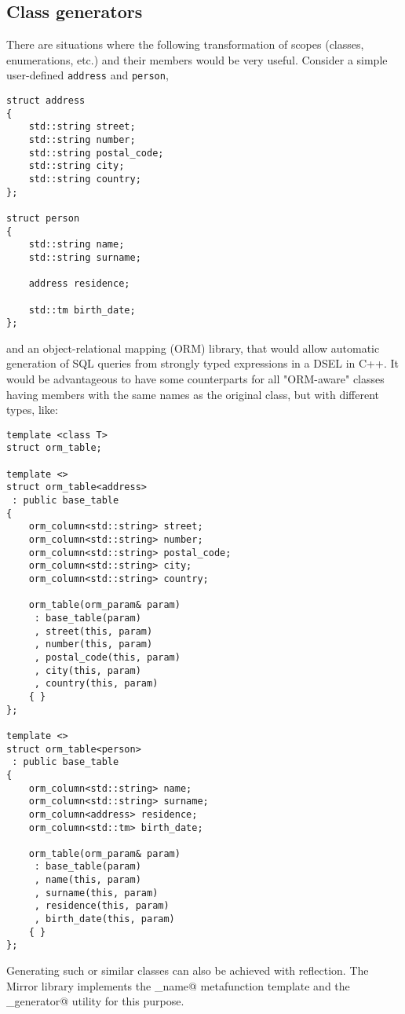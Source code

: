 \subsection{Class generators}
\label{class-generators}

There are situations where the following transformation of
scopes (classes, enumerations, etc.) and their members would be very useful.
Consider a simple user-defined \verb@struct@s
\verb|address| and \verb|person|,

\begin{verbatim}
struct address
{
	std::string street;
	std::string number;
	std::string postal_code;
	std::string city;
	std::string country;
};

struct person
{
	std::string name;
	std::string surname;

	address residence;

	std::tm birth_date;
};
\end{verbatim}

and an object-relational mapping (ORM)
library, that would allow automatic generation of SQL queries
from strongly typed expressions in a DSEL in C++. It would
be advantageous to have some counterparts for all "ORM-aware"
classes having members with the same names as the original
class, but with different types, like:

\begin{verbatim}
template <class T>
struct orm_table;

template <>
struct orm_table<address>
 : public base_table
{
	orm_column<std::string> street;
	orm_column<std::string> number;
	orm_column<std::string> postal_code;
	orm_column<std::string> city;
	orm_column<std::string> country;

	orm_table(orm_param& param)
	 : base_table(param)
	 , street(this, param)
	 , number(this, param)
	 , postal_code(this, param)
	 , city(this, param)
	 , country(this, param)
	{ }
};

template <>
struct orm_table<person>
 : public base_table
{
	orm_column<std::string> name;
	orm_column<std::string> surname;
	orm_column<address> residence;
	orm_column<std::tm> birth_date;

	orm_table(orm_param& param)
	 : base_table(param)
	 , name(this, param)
	 , surname(this, param)
	 , residence(this, param)
	 , birth_date(this, param)
	{ }
};
\end{verbatim}

Generating such or similar classes can also be achieved with reflection.
The Mirror library implements the \verb@by_name@ metafunction template
and the \verb@class_generator@ utility for this purpose.

